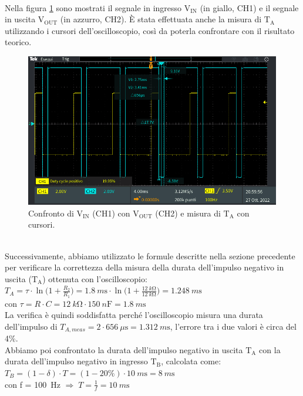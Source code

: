 \documentclass{report}
\begin{document}
\\Nella figura \ref{figura:TEK00002} sono mostrati il segnale in ingresso $\mathrm{V_{IN}}$ (in giallo, CH1) e il segnale in uscita $\mathrm{V_{OUT}}$ (in azzurro, CH2). \`E stata effettuata anche la misura di $\mathrm{T_A}$ utilizzando i cursori dell'oscilloscopio, così da poterla confrontare con il risultato teorico.
\begin{figure}[h!]
	\centering
	\includegraphics[height=6.7cm]{immagini/TEK00002}
	\caption{Confronto di $\mathrm{V_{IN}}$ (CH1) con $\mathrm{V_{OUT}}$ (CH2) e misura di $\mathrm{T_A}$ con cursori.}
	\label{figura:TEK00002}
\end{figure}
\\Successivamente, abbiamo utilizzato le formule descritte nella sezione precedente per verificare la correttezza della misura della durata dell'impulso negativo in uscita ($\mathrm{T_A}$) ottenuta con l'oscilloscopio:
\\[4pt]\indent$\displaystyle{T_A=\tau\cdot\ln\biggl(1+\frac{R_2}{R_1}\biggr)=\SI{1.8}{m\second}\cdot\ln\biggl(1+\frac{\SI{12}{k\ohm}}{\SI{12}{k\ohm}}\biggr)=\SI{1.248}{m\second}}$
\\[4pt]\indent con $\displaystyle{\tau=R \cdot C=\SI{12}{k\ohm}\cdot\SI{150}{n\farad}=\SI{1.8}{m\second}}$
\\[4pt]La verifica è quindi soddisfatta perché l'oscilloscopio misura una durata dell'impulso di $\displaystyle{T_{A,meas}=2\cdot\SI{656}{\mu\second}=\SI{1.312}{m\second}}$, l'errore tra i due valori è circa del 4\%. 
\\ Abbiamo poi confrontato la durata dell'impulso negativo in uscita $\mathrm{T_A}$ con la durata dell'impulso negativo in ingresso $\mathrm{T_B}$, calcolata come:
\\[4pt]\indent$\displaystyle{T_B=(1-\delta)\cdot T=(1-20\%)\cdot\SI{10}{m\second}=\SI{8}{m\second}}$
\\[4pt]\indent con f = \SI{100}{\hertz} $\Rightarrow\;\displaystyle{T=\frac{1}{f}=\SI{10}{m\second}}$
\end{document}
